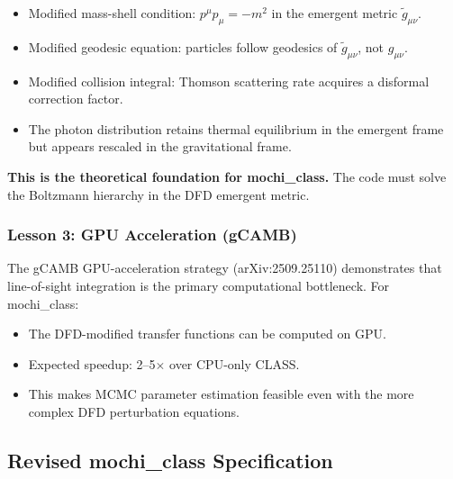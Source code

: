 \documentclass[11pt]{article}
\begin{document}
\begin{itemize}
  \item Modified mass-shell condition: $p^\mu p_\mu = -m^2$ in the
    emergent metric $\tilde{g}_{\mu\nu}$.
  \item Modified geodesic equation: particles follow geodesics of
    $\tilde{g}_{\mu\nu}$, not $g_{\mu\nu}$.
  \item Modified collision integral: Thomson scattering rate acquires
    a disformal correction factor.
  \item The photon distribution retains thermal equilibrium in the
    emergent frame but appears rescaled in the gravitational frame.
\end{itemize}

\textbf{This is the theoretical foundation for mochi\_class.} The
code must solve the Boltzmann hierarchy in the DFD emergent metric.

\subsubsection{Lesson 3: GPU Acceleration (gCAMB)}

The gCAMB GPU-acceleration strategy (arXiv:2509.25110) demonstrates
that line-of-sight integration is the primary computational bottleneck.
For mochi\_class:

\begin{itemize}
  \item The DFD-modified transfer functions can be computed on GPU.
  \item Expected speedup: 2--5$\times$ over CPU-only CLASS.
  \item This makes MCMC parameter estimation feasible even with
    the more complex DFD perturbation equations.
\end{itemize}

\subsection{Revised mochi\_class Specification}
\end{document}
